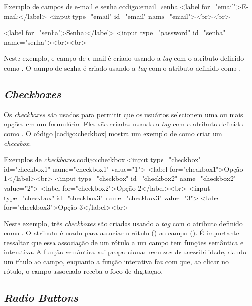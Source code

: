\begin{htmlcode}{Exemplo de campos de e-mail e senha.}{codigo:email_senha}
<label for="email">E-mail:</label>
<input type="email" id="email" name="email"><br><br>

<label for="senha">Senha:</label>
<input type="password" id="senha" name="senha"><br><br>
\end{htmlcode}

Neste exemplo, o campo de e-mail é criado usando a \textit{tag}  com o atributo  definido como . O campo de senha é criado usando a \textit{tag}  com o atributo  definido como .

\subsection{\textit{Checkboxes}}

Os \textit{checkboxes} são usados para permitir que os usuários selecionem uma ou mais opções em um formulário. Eles são criados usando a \textit{tag}  com o atributo  definido como . O código \ref{codigo:checkbox} mostra um exemplo de como criar um \textit{checkbox}.

\begin{htmlcode}{Exemplos de \textit{checkboxes}.}{codigo:checkbox}
<input type="checkbox" id="checkbox1" name="checkbox1" value="1">
<label for="checkbox1">Opção 1</label><br>
<input type="checkbox" id="checkbox2" name="checkbox2" value="2">
<label for="checkbox2">Opção 2</label><br>
<input type="checkbox" id="checkbox3" name="checkbox3" value="3">
<label for="checkbox3">Opção 3</label><br>
\end{htmlcode}

Neste exemplo, três \textit{checkboxes} são criados usando a \textit{tag}  com o atributo  definido como . O atributo  é usado para associar o rótulo () ao campo (). É importante ressaltar que essa associação de um rótulo a um campo tem funções semântica e interativa. A função semântica vai proporcionar recursos de acessibilidade, dando um título ao campo, enquanto a função interativa faz com que, ao clicar no rótulo, o campo associado receba o foco de digitação.

\subsection{\textit{Radio Buttons}}

